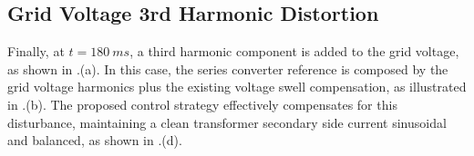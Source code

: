 \subsection{Grid Voltage 3rd Harmonic Distortion}
Finally, at $t = 180\ ms$, a third harmonic component is added to the grid voltage, as shown in .(a). In this case, the series converter reference is composed by the grid voltage harmonics plus the existing voltage swell compensation, as illustrated in .(b). The proposed control strategy effectively compensates for this disturbance, maintaining a clean transformer secondary side current sinusoidal and balanced, as shown in .(d).